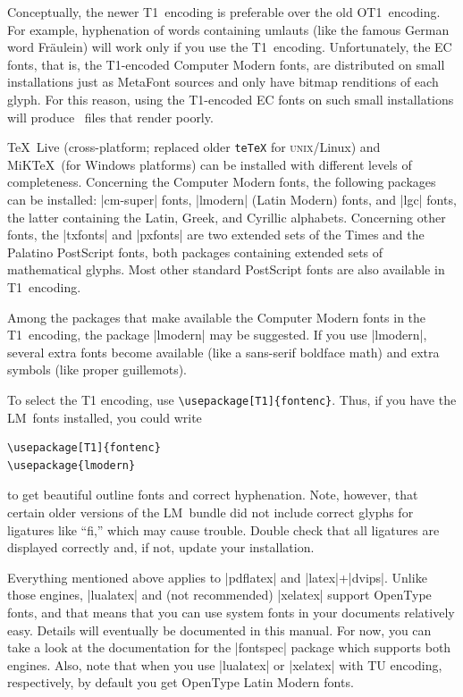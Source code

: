 Conceptually, the newer T1~encoding is preferable over the old OT1~encoding. For example, hyphenation of words containing umlauts (like the famous German word Fr\"aulein) will work only if you use the T1~encoding. Unfortunately, the EC fonts, that is, the T1-encoded Computer Modern fonts, are distributed on small installations just as MetaFont sources and only have bitmap renditions of each glyph. For this reason, using the T1-encoded EC fonts on such small installations will produce \pdf\ files that render poorly.

\TeX\ Live (cross-platform; replaced older \texttt{teTeX} for \textsc{unix}\slash Linux) and MiK\TeX\ (for Windows platforms) can be installed with different levels of completeness. Concerning the Computer Modern fonts, the following packages can be installed: |cm-super| fonts, |lmodern| (Latin Modern) fonts, and |lgc| fonts, the latter containing the Latin, Greek, and Cyrillic alphabets. Concerning other fonts, the |txfonts| and |pxfonts| are two extended sets of the Times and the Palatino PostScript fonts, both packages containing extended sets of mathematical glyphs. Most other standard PostScript fonts are also available in T1~encoding.

Among the packages that make available the Computer Modern fonts in the T1~encoding, the package |lmodern| may be suggested. If you use |lmodern|, several extra fonts become available (like a sans-serif boldface math) and extra symbols (like proper guillemots).

To select the T1 encoding, use \verb|\usepackage[T1]{fontenc}|. Thus, if you have the LM~fonts installed, you could write
\begin{verbatim}
\usepackage[T1]{fontenc}
\usepackage{lmodern}
\end{verbatim}
to get beautiful outline fonts and correct hyphenation. Note, however, that certain older versions of the LM~bundle did not include correct glyphs for ligatures like ``fi,'' which may cause trouble. Double check that all ligatures are displayed correctly and, if not, update your installation.

Everything mentioned above applies to |pdflatex| and |latex|+|dvips|. Unlike those engines, |lualatex| and (not recommended) |xelatex| support OpenType fonts, and that means that you can use system fonts in your documents relatively easy. Details will eventually be documented in this manual. For now, you can take a look at the documentation for the |fontspec| package which supports both engines. Also, note that when you use |lualatex| or |xelatex| with TU encoding, respectively, by default you get OpenType Latin Modern fonts.



